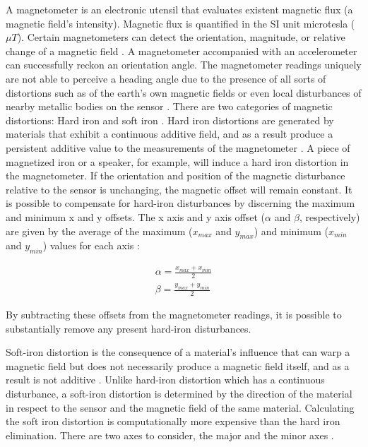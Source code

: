 A magnetometer is an electronic utensil that evaluates existent magnetic flux (a magnetic field's intensity). Magnetic flux is quantified in the SI unit microtesla ($\mu T$). Certain magnetometers can detect the orientation, magnitude, or relative change of a magnetic field \cite{caruso1998new}. A magnetometer accompanied with an accelerometer can successfully reckon an orientation angle. The magnetometer readings uniquely are not able to perceive a heading angle due to the presence of all sorts of distortions such as of the earth's own magnetic fields or even local disturbances of nearby metallic bodies on the sensor \cite{silva2021error} \cite{caruso1998new}. There are two categories of magnetic distortions: Hard iron and soft iron \cite{wahdan2014magnetometer}. Hard iron distortions are generated by materials that exhibit a continuous additive field, and as a result produce a persistent additive value to the measurements of the magnetometer \cite{guo2008soft}. A piece of magnetized iron or a speaker, for example, will induce a hard iron distortion in the magnetometer. If the orientation and position of the magnetic disturbance relative to the sensor is unchanging, the magnetic offset will remain constant. It is possible to compensate for hard-iron disturbances by discerning the maximum and minimum x and y offsets. The x axis and y axis offset ($\alpha$ and $\beta$, respectively) are given by the average of the maximum ($x_{max}$ and $y_{max}$) and minimum ($x_{min}$ and $y_{min}$) values for each axis \cite{daponte2017method}:

\begin{equation}
  \begin{gathered}
    \alpha = \frac{x_{max}+x_{min}}{2}\\
    \beta = \frac{y_{max}+y_{min}}{2}
  \end{gathered}
\end{equation}

By subtracting these offsets from the magnetometer readings, it is possible to substantially remove any present hard-iron disturbances.

Soft-iron distortion is the consequence of a material's influence that can warp a magnetic field but does not necessarily produce a magnetic field itself, and as a result is not additive \cite{bachmann2004investigation}. Unlike hard-iron distortion which has a continuous disturbance, a soft-iron distortion is determined by the direction of the material in respect to the sensor and the magnetic field of the same material. Calculating the soft iron distortion is computationally more expensive than the hard iron elimination. There are two axes to consider, the major and the minor axes \cite{roetenberg2005compensation}.

